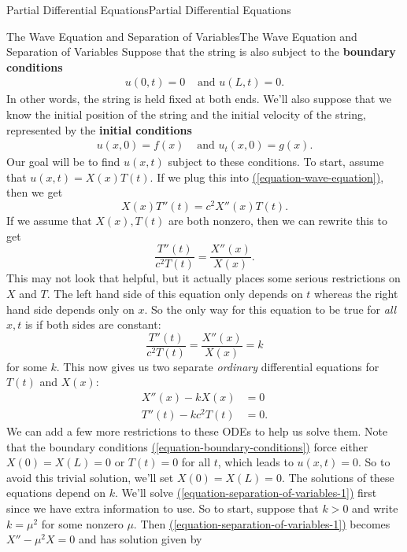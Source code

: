 \documentclass[10pt,]{book}
\newcommand{\terminology}[1]{\textbf{#1}}
\numberwithin{equation}{section}
\begin{document}
\begin{chapterptx}{Partial Differential Equations}{}{Partial Differential Equations}{}{}
\begin{sectionptx}{The Wave Equation and Separation of Variables}{}{The Wave Equation and Separation of Variables}{}{}
\hypertarget{p-454}{}%
Suppose that the string is also subject to the \terminology{boundary conditions}%
%
\begin{align}
u(0,t) = 0 &\text{ and } u(L,t) = 0. \label{equation-boundary-conditions}
\end{align}
\hypertarget{p-455}{}%
In other words, the string is held fixed at both ends. We'll also suppose that we know the initial position of the string and the initial velocity of the string, represented by the \terminology{initial conditions}%
%
\begin{align}
u(x,0) = f(x) & \text{ and } u_{t}(x,0) = g(x). \label{equation-initial-condition}
\end{align}
\hypertarget{p-456}{}%
Our goal will be to find \(u(x,t)\) subject to these conditions. To start, assume that \(u(x,t) = X(x)T(t).\) If we plug this into \hyperref[equation-wave-equation]{(\ref{equation-wave-equation})}, then we get%
%
\begin{equation*}
X(x)T''(t) = c^{2}X''(x)T(t).
\end{equation*}
\hypertarget{p-457}{}%
If we assume that \(X(x),T(t)\) are both nonzero, then we can rewrite this to get%
%
\begin{equation*}
\frac{T''(t)}{c^{2}T(t)} = \frac{X''(x)}{X(x)}.
\end{equation*}
\hypertarget{p-458}{}%
This may not look that helpful, but it actually places some serious restrictions on \(X\) and \(T\). The left hand side of this equation only depends on \(t\) whereas the right hand side depends only on \(x\). So the only way for this equation to be true for \emph{all} \(x,t\) is if both sides are constant:%
%
\begin{equation*}
\frac{T''(t)}{c^{2}T(t)} = \frac{X''(x)}{X(x)} = k
\end{equation*}
\hypertarget{p-459}{}%
for some \(k\). This now gives us two separate \emph{ordinary} differential equations for \(T(t)\) and \(X(x)\):%
%
\begin{align}
X''(x) - kX(x) & = 0 \label{equation-separation-of-variables-1}\\
T''(t) - kc^{2}T(t) & = 0. \label{equation-separation-of-variables-2}
\end{align}
\hypertarget{p-460}{}%
We can add a few more restrictions to these ODEs to help us solve them. Note that the boundary conditions \hyperref[equation-boundary-conditions]{(\ref{equation-boundary-conditions})} force either \(X(0) = X(L) = 0\) or \(T(t) = 0\) for all \(t\), which leads to \(u(x,t) = 0\). So to avoid this trivial solution, we'll set \(X(0) = X(L) = 0\). The solutions of these equations depend on \(k\). We'll solve \hyperref[equation-separation-of-variables-1]{(\ref{equation-separation-of-variables-1})} first since we have extra information to use. So to start, suppose that \(k>0\) and write \(k = \mu^{2}\) for some nonzero \(\mu\). Then \hyperref[equation-separation-of-variables-1]{(\ref{equation-separation-of-variables-1})} becomes \(X''-\mu^{2}X = 0\) and has solution given by%

\end{sectionptx}
\end{chapterptx}
\end{document}
